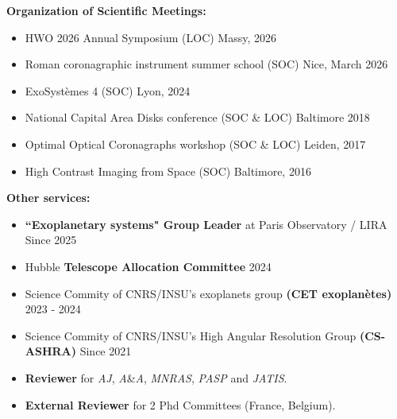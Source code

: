 \documentclass[11pt]{article}
\begin{document}
\vspace{-0.1cm}
\textbf{Organization of Scientific Meetings:}
\vspace{-0.2cm}

\begin{itemize} \itemsep -2pt
    \item[$\bullet$] HWO 2026 Annual Symposium (LOC) \hfill  Massy, 2026
    \item[$\bullet$] Roman coronagraphic instrument summer school (SOC) \hfill  Nice, March 2026
    \item[$\bullet$] ExoSystèmes 4 (SOC) \hfill Lyon, 2024
    \item[$\bullet$] National Capital Area Disks conference (SOC \& LOC) \hfill Baltimore 2018
    \item[$\bullet$] Optimal Optical Coronagraphs workshop (SOC \& LOC) \hfill  Leiden, 2017
    \item[$\bullet$] High Contrast Imaging from Space (SOC) \hfill  Baltimore, 2016
\end{itemize}

\vspace{-0.1cm}
\textbf{Other services:}
\vspace{-0.2cm}

\begin{itemize} \itemsep -2pt
    \item[$\bullet$] \textbf{``Exoplanetary systems" Group Leader} at Paris Observatory / LIRA \hfill Since 2025
    \item[$\bullet$] Hubble \textbf{Telescope Allocation Committee} \hfill 2024
    \item[$\bullet$] Science Commity of CNRS/INSU's exoplanets group \textbf{(CET exoplanètes)}  \hfill 2023 - 2024
    \item[$\bullet$] Science Commity of CNRS/INSU's High Angular Resolution Group \textbf{(CS-ASHRA)} \hfill Since 2021
    \item[$\bullet$] \textbf{Reviewer} for \textit{AJ}, \textit{A}\&\textit{A}, \textit{MNRAS}, \textit{PASP} and \textit{JATIS}.
    \item[$\bullet$] \textbf{External Reviewer} for 2 Phd Committees (France, Belgium).

\end{itemize}
\end{document}
